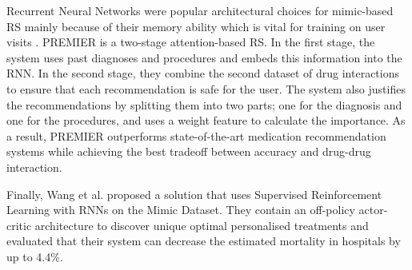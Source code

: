 Recurrent Neural Networks were popular architectural choices for mimic-based RS
mainly because of their memory ability which is vital for training on user
visits \cite{Wang}. PREMIER \cite{Bhoi2021} is a two-stage attention-based RS. In the first stage, the
system uses past diagnoses and procedures and embeds this information into the
RNN. In the second stage, they combine the second dataset of drug interactions
to ensure that each recommendation is safe for the user. The system also
justifies the recommendations by splitting them into two parts; one for the
diagnosis and one for the procedures, and uses a weight feature to calculate
the importance. As a result, PREMIER outperforms state-of-the-art medication
recommendation systems while achieving the best tradeoff between accuracy and
drug-drug interaction.



Finally, Wang et al. \cite{Wang} proposed a solution that uses Supervised Reinforcement
Learning with RNNs on the Mimic Dataset. They contain an off-policy
actor-critic architecture to discover unique optimal personalised
treatments and evaluated that their system can decrease the estimated
mortality in hospitals by up to 4.4\%.

